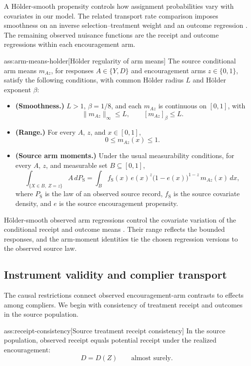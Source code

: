 \documentclass[11pt]{article}
\begin{document}
A Hölder-smooth propensity controls how assignment probabilities vary with covariates in our model. The related transport rate comparison imposes smoothness on an inverse selection--treatment weight and an outcome regression \citep{ZengKennedyBodnarNaimi2025Efficient}. The remaining observed nuisance functions are the receipt and outcome regressions within each encouragement arm.

\begin{assumptionv}{ass:arm-means-holder}[Hölder regularity of arm means]
The source conditional arm means \(m_{Az}\), for responses \(A\in\{Y,D\}\) and encouragement arms \(z\in\{0,1\}\), satisfy the following conditions, with common Hölder radius \(L\) and Hölder exponent \(\beta\):
\begin{itemize}
\item \textbf{(Smoothness.)} \(L>1\), \(\beta=1/8\), and each \(m_{Az}\) is continuous on \([0,1]\), with
\[
\lVert m_{Az}\rVert_\infty\le L,
\qquad
[m_{Az}]_\beta\le L.
\]
\item \textbf{(Range.)} For every \(A\), \(z\), and \(x\in[0,1]\),
\[
0\le m_{Az}(x)\le 1.
\]
\item \textbf{(Source arm moments.)} Under the usual measurability conditions, for every \(A\), \(z\), and measurable set \(B\subseteq[0,1]\),
\[
\int_{\{X\in B,\;Z=z\}} A\,dP_{\mathrm S}
=
\int_B f_{\mathrm S}(x)\,
e(x)^z\bigl(1-e(x)\bigr)^{1-z}\,
m_{Az}(x)\,dx,
\]
where \(P_{\mathrm S}\) is the law of an observed source record, \(f_{\mathrm S}\) is the source covariate density, and \(e\) is the source encouragement propensity.
\end{itemize}
\end{assumptionv}

Hölder-smooth observed arm regressions control the covariate variation of the conditional receipt and outcome means \citep{ZengKennedyBodnarNaimi2025Efficient}. Their range reflects the bounded responses, and the arm-moment identities tie the chosen regression versions to the observed source law.

\subsection{Instrument validity and complier transport}

The causal restrictions connect observed encouragement-arm contrasts to effects among compliers. We begin with consistency of treatment receipt and outcomes in the source population.

\begin{assumptionv}{ass:receipt-consistency}[Source treatment receipt consistency]
In the source population, observed receipt equals potential receipt under the realized encouragement:
\[
D=D(Z)\qquad\text{almost surely}.
\]
\end{assumptionv}
\end{document}

